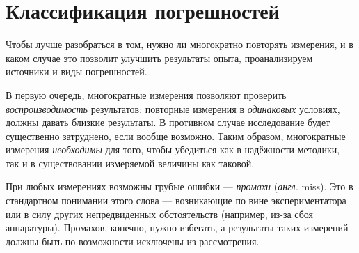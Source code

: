 
\section{Классификация погрешностей}

Чтобы лучше разобраться в том, нужно ли многократно повторять измерения,
и в каком случае это позволит улучшить результаты опыта,
проанализируем источники и виды погрешностей.

В первую очередь, многократные измерения позволяют проверить
\emph{воспроизводимость} результатов: повторные измерения в \emph{одинаковых}
условиях, должны давать близкие результаты. В противном случае
исследование будет существенно затруднено, если вообще возможно.
Таким образом, многократные измерения \emph{необходимы} для того,
чтобы убедиться как в надёжности методики, так и в существовании измеряемой
величины как таковой.

При любых измерениях возможны грубые ошибки --- \emph{промахи}
(\emph{англ.} miss). Это  в стандартном
понимании этого слова --- возникающие по вине экспериментатора
или в силу других непредвиденных обстоятельств (например, из-за сбоя
аппаратуры). Промахов, конечно, нужно избегать, а результаты таких
измерений должны быть по возможности исключены из рассмотрения.


